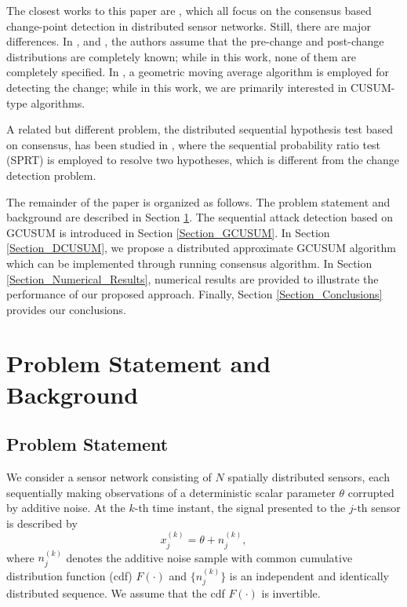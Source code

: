 \documentclass[11pt, draftclsnofoot, onecolumn]{IEEEtran}
\begin{document}
The closest works to this paper are \cite{braca2011consensus, stankovic2011distributed, ilic2012consensus, liu2017distributed}, which all focus on the consensus based change-point detection in distributed sensor networks. Still, there are major differences. In \cite{stankovic2011distributed}, \cite{braca2011consensus} and \cite{liu2017distributed}, the authors assume that the pre-change and post-change distributions are completely known; while in this work, none of them are completely specified. In \cite{ilic2012consensus}, a geometric moving average algorithm is employed for detecting the change; while in this work, we are primarily interested in  CUSUM-type algorithms.

A related but different problem, the distributed sequential hypothesis test based on consensus, has been studied in \cite{sahu2016distributed, li2016order},   where   the sequential probability ratio test   (SPRT) is employed    to resolve two hypotheses, which is different from the   change detection problem.  

The remainder of the paper is organized as follows. The
problem statement and background are described in Section \ref{Section_System_Model}. The
sequential attack detection based on GCUSUM is introduced  in Section \ref{Section_GCUSUM}. In Section \ref{Section_DCUSUM}, we propose a distributed approximate   GCUSUM   algorithm which can be implemented through running consensus algorithm. In Section \ref{Section_Numerical_Results},  numerical results are provided to illustrate the performance of our proposed approach. Finally, Section \ref{Section_Conclusions} provides our conclusions.





\section{Problem Statement and Background}
\label{Section_System_Model}



\subsection{Problem Statement}

We consider a  sensor network consisting of $N$ spatially distributed sensors, each sequentially making observations of a  deterministic scalar parameter $\theta$ corrupted by additive noise. At the $k$-th time instant, the signal presented to the $j$-th sensor is described by
\begin{equation} \label{x_j_k_model}
x_j^{\left( k \right)} = \theta  + n_j^{\left( k \right)},
\end{equation}
where $n_j ^{(k)}$ denotes the additive noise sample with common cumulative distribution function (cdf) $F(\cdot)$ and $\{n_j^{(k)}\}$ is an independent and identically distributed sequence. We assume that the cdf $F(\cdot)$ is invertible. 
\end{document}
